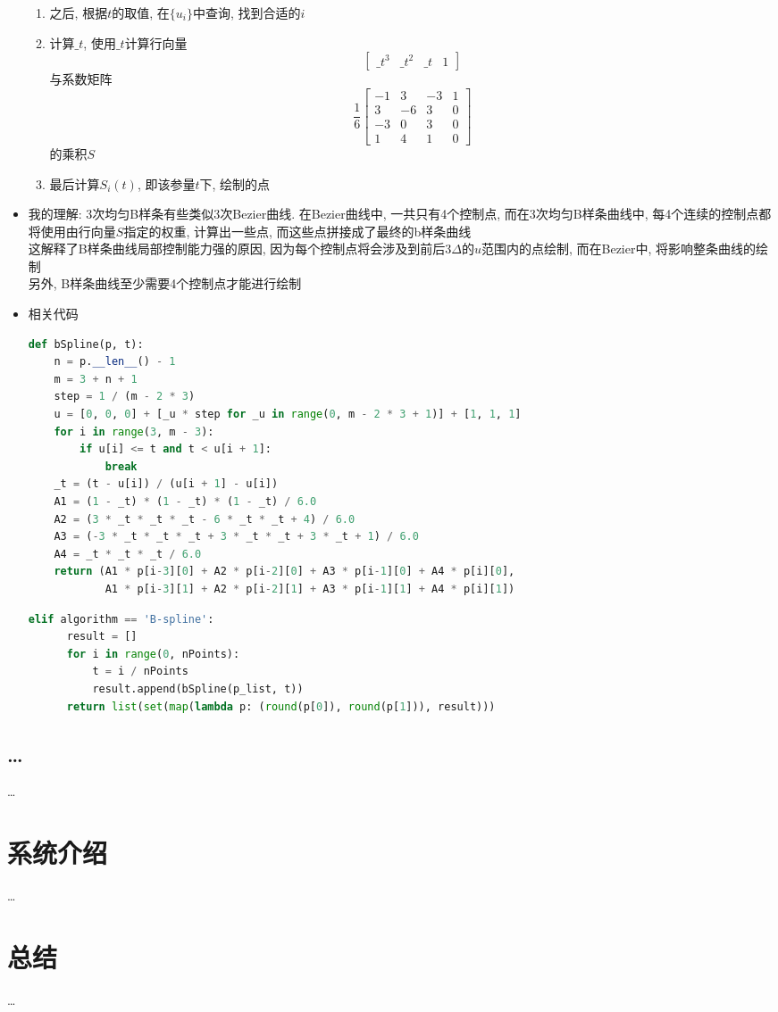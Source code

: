 \documentclass[a4paper,UTF8]{article}
\theoremstyle{definition}
\begin{document}
\begin{itemize}
\begin{enumerate}
    \item 之后, 根据$t$的取值, 在$\{u_i\}$中查询, 找到合适的$i$
    \item 计算$\_t$, 使用$\_t$计算行向量$$\begin{bmatrix} \_t^3 & \_t^2 & \_t & 1 \end{bmatrix}$$与系数矩阵$$\frac{1}{6} \begin{bmatrix} -1 &  3 & -3 & 1 \\  3 & -6 &  3 & 0 \\ -3 &  0 &  3 & 0 \\  1 &  4 &  1 & 0 \end{bmatrix}$$的乘积$S$
    \item 最后计算$S_i(t)$, 即该参量$t$下, 绘制的点
  \end{enumerate}
  \item 我的理解: 3次均匀B样条有些类似3次Bezier曲线. 在Bezier曲线中, 一共只有4个控制点, 而在3次均匀B样条曲线中, 每4个连续的控制点都将使用由行向量$S$指定的权重, 计算出一些点, 而这些点拼接成了最终的b样条曲线\\
  这解释了B样条曲线局部控制能力强的原因, 因为每个控制点将会涉及到前后$3\Delta$的$u$范围内的点绘制, 而在Bezier中, 将影响整条曲线的绘制\\
  另外, B样条曲线至少需要4个控制点才能进行绘制
  \item 相关代码
  \begin{lstlisting}[language={Python}] 
    def bSpline(p, t):
    n = p.__len__() - 1
    m = 3 + n + 1
    step = 1 / (m - 2 * 3)
    u = [0, 0, 0] + [_u * step for _u in range(0, m - 2 * 3 + 1)] + [1, 1, 1]
    for i in range(3, m - 3):
        if u[i] <= t and t < u[i + 1]:
            break
    _t = (t - u[i]) / (u[i + 1] - u[i])
    A1 = (1 - _t) * (1 - _t) * (1 - _t) / 6.0
    A2 = (3 * _t * _t * _t - 6 * _t * _t + 4) / 6.0
    A3 = (-3 * _t * _t * _t + 3 * _t * _t + 3 * _t + 1) / 6.0
    A4 = _t * _t * _t / 6.0
    return (A1 * p[i-3][0] + A2 * p[i-2][0] + A3 * p[i-1][0] + A4 * p[i][0],
            A1 * p[i-3][1] + A2 * p[i-2][1] + A3 * p[i-1][1] + A4 * p[i][1])
\end{lstlisting}
\begin{lstlisting}[language={Python}] 
  elif algorithm == 'B-spline':
      result = []
      for i in range(0, nPoints):
          t = i / nPoints
          result.append(bSpline(p_list, t))
      return list(set(map(lambda p: (round(p[0]), round(p[1])), result)))
\end{lstlisting}
\end{itemize}
\subsection{\dots}
\dots
		
\section{系统介绍}
\dots

\section{总结}
\dots

%

\end{document}
